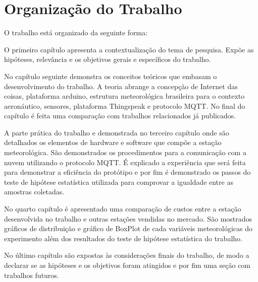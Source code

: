 \section{Organização do Trabalho}

O trabalho está organizado da seguinte forma:

O primeiro capítulo apresenta a contextualização do tema de pesquisa. 
Expõe as hipóteses, relevância e os objetivos gerais e específicos do trabalho.

No capítulo seguinte demonstra os conceitos teóricos que embasam o desenvolvimento do trabalho. A teoria abrange a concepção de Internet das coisas, plataforma arduino, estrutura meteorológica brasileira para o contexto aeronáutico, sensores, plataforma Thingspeak e protocolo MQTT. No final do capítulo é feita uma comparação com trabalhos relacionados já publicados.

A parte prática do trabalho e demonstrada no terceiro capítulo onde são detalhados os elementos de hardware e software que compõe a estação meteorológica. São demonstrados os procedimentos para a comunicação com a nuvem utilizando o protocolo MQTT. É explicado a experiência que será feita para demonstrar a eficiência do protótipo e por fim é demonstrado os passos do teste de hipótese estatística utilizada para comprovar a igualdade entre as amostras coletadas.

No quarto capítulo é apresentado uma comparação de custos entre a estação desenvolvida no trabalho e outras estações vendidas no mercado. São mostrados gráficos de distribuição e gráfico de BoxPlot de cada variáveis meteorológicas do experimento além dos resultados do teste de hipótese estatística do trabalho.

No último capítulo são expostas às considerações finais do trabalho, de modo a declarar se as hipóteses e os objetivos foram atingidos e por fim uma seção com trabalhos futuros.








 









